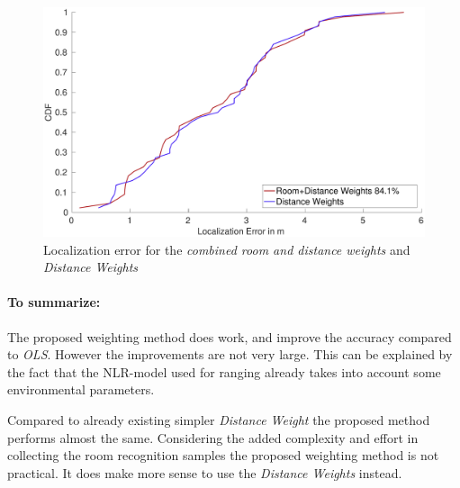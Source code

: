 \begin{figure}
\centering
\includegraphics[width=\textwidth]{Figures/WeightingCDF_realDistance}
\decoRule
\caption[Weighting method comparison]{Localization error for the \emph{combined room and distance weights} and \emph{Distance Weights}}
\label{fig:WeightingCDFrealDistance}
\end{figure}


\paragraph{To summarize:} 

The proposed weighting method does work, and improve the accuracy compared to \emph{OLS}. However the improvements are not very large. This can be explained by the fact that the NLR-model used for ranging already takes into account some environmental parameters.

Compared to already existing simpler \emph{Distance Weight} the proposed method performs almost the same. Considering the added complexity and effort in collecting the room recognition samples the proposed weighting method is not practical. It does make more sense to use the \emph{Distance Weights} instead.


